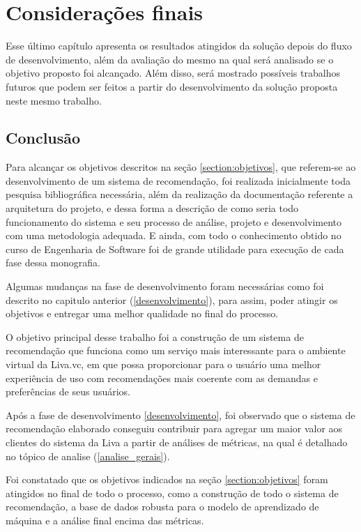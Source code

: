 \chapter{Considerações finais}

Esse último capítulo apresenta os resultados atingidos da solução depois do fluxo de desenvolvimento, além da avaliação do mesmo na qual será analisado se o objetivo proposto foi alcançado. Além disso, será mostrado possíveis trabalhos futuros que podem ser feitos a partir do desenvolvimento da solução proposta neste mesmo trabalho.

\section{Conclusão}

Para alcançar os objetivos descritos na seção \ref{section:objetivos}, que referem-se ao desenvolvimento de um sistema de recomendação, foi realizada inicialmente toda pesquisa bibliográfica necessária, além da realização da documentação referente a arquitetura do projeto, e dessa forma a descrição de como seria todo funcionamento do sistema e seu processo de análise, projeto e desenvolvimento com uma metodologia adequada. E ainda, com todo o conhecimento obtido no curso de Engenharia de Software foi de grande utilidade para execução de cada fase dessa monografia.

Algumas mudanças na fase de desenvolvimento foram necessárias como foi descrito no capitulo anterior (\ref{desenvolvimento}), para assim, poder atingir os objetivos e entregar uma melhor qualidade no final do processo.

O objetivo principal desse trabalho foi a construção de um sistema de recomendação que funciona como um serviço mais interessante para o ambiente virtual da Liva.vc, em que possa proporcionar para o usuário uma melhor experiência de uso com recomendações mais coerente com as demandas e preferências de seus usuários.

Após a fase de desenvolvimento \ref{desenvolvimento}, foi observado que o sistema de recomendação elaborado conseguiu contribuir para agregar um maior valor aos clientes do sistema da Liva a partir de análises de métricas, na qual é detalhado no tópico de analise (\ref{analise_gerais}).

Foi constatado que os objetivos indicados na seção \ref{section:objetivos} foram atingidos no final de todo o processo, como a construção de todo o sistema de recomendação, a base de dados robusta para o modelo de aprendizado de máquina e a análise final encima das métricas.

